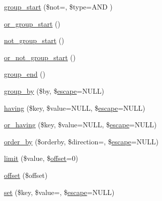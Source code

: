 \begin{DoxyCompactItemize}
\item 
\mbox{\hyperlink{class_c_i___d_b__query__builder_aace0c009f52375adf5dffe6596330272}{group\+\_\+start}} (\$not=\textquotesingle{}\textquotesingle{}, \$type=\textquotesingle{}A\+ND \textquotesingle{})
\item 
\mbox{\hyperlink{class_c_i___d_b__query__builder_aaecca382fc4c5d3030c063035c42ce59}{or\+\_\+group\+\_\+start}} ()
\item 
\mbox{\hyperlink{class_c_i___d_b__query__builder_a2d28f2d014179abbc70bce1502dfb73c}{not\+\_\+group\+\_\+start}} ()
\item 
\mbox{\hyperlink{class_c_i___d_b__query__builder_afb77fa2848315cc7b1f1e8931612ec42}{or\+\_\+not\+\_\+group\+\_\+start}} ()
\item 
\mbox{\hyperlink{class_c_i___d_b__query__builder_ad54860edb51a86b1d6e615f766057f3a}{group\+\_\+end}} ()
\item 
\mbox{\hyperlink{class_c_i___d_b__query__builder_ad56fca465b77d095482c454d10700bf3}{group\+\_\+by}} (\$by, \$\mbox{\hyperlink{class_c_i___d_b__driver_a75beb60cdd3ee1875646d729963f5f5f}{escape}}=N\+U\+LL)
\item 
\mbox{\hyperlink{class_c_i___d_b__query__builder_afabb171b46c879dfe91513d754e27a37}{having}} (\$key, \$value=N\+U\+LL, \$\mbox{\hyperlink{class_c_i___d_b__driver_a75beb60cdd3ee1875646d729963f5f5f}{escape}}=N\+U\+LL)
\item 
\mbox{\hyperlink{class_c_i___d_b__query__builder_aa0f66cc593d2a018f961062d735c962b}{or\+\_\+having}} (\$key, \$value=N\+U\+LL, \$\mbox{\hyperlink{class_c_i___d_b__driver_a75beb60cdd3ee1875646d729963f5f5f}{escape}}=N\+U\+LL)
\item 
\mbox{\hyperlink{class_c_i___d_b__query__builder_a962f40c8b808afaaf118f4eb4c8b3d2b}{order\+\_\+by}} (\$orderby, \$direction=\textquotesingle{}\textquotesingle{}, \$\mbox{\hyperlink{class_c_i___d_b__driver_a75beb60cdd3ee1875646d729963f5f5f}{escape}}=N\+U\+LL)
\item 
\mbox{\hyperlink{class_c_i___d_b__query__builder_a1b72e2941924e573f5efb95f8dbc9815}{limit}} (\$value, \$\mbox{\hyperlink{class_c_i___d_b__query__builder_a20768a139b4c62547f6fb4b55d5c734f}{offset}}=0)
\item 
\mbox{\hyperlink{class_c_i___d_b__query__builder_a20768a139b4c62547f6fb4b55d5c734f}{offset}} (\$offset)
\item 
\mbox{\hyperlink{class_c_i___d_b__query__builder_ac895a54db4870f128d0ef2426e4c282f}{set}} (\$key, \$value=\textquotesingle{}\textquotesingle{}, \$\mbox{\hyperlink{class_c_i___d_b__driver_a75beb60cdd3ee1875646d729963f5f5f}{escape}}=N\+U\+LL)

\end{DoxyCompactItemize}

